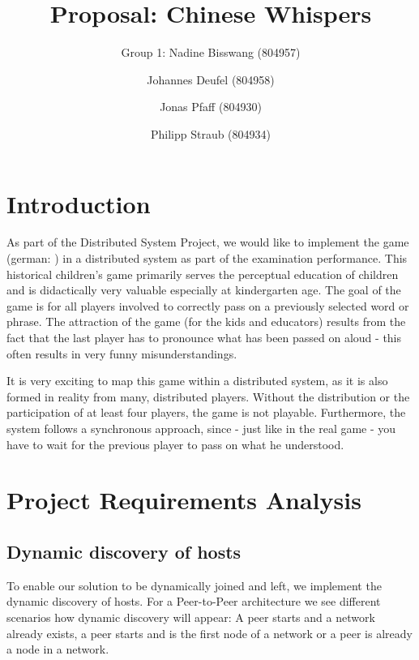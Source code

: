\documentclass[runningheads]{llncs}
\begin{document}
\title{Proposal: Chinese Whispers}

\author{Group 1: Nadine Bisswang (804957) \and Johannes Deufel (804958) \and Jonas Pfaff (804930) \and Philipp Straub (804934)}

\institute{}
%
\maketitle              %
\section{Introduction}
    As part of the Distributed System Project, we would like to implement the game  (german: ) in a distributed system as part of the examination performance. 
    This historical children's game primarily serves the perceptual education of children and is didactically very valuable especially at kindergarten age. The goal of the game is for all players involved to correctly pass on a previously selected word or phrase. The attraction of the game (for the kids and educators) results from the fact that the last player has to pronounce what has been passed on aloud - this often results in very funny misunderstandings. 
    
    
    It is very exciting to map this game within a distributed system, as it is also formed in reality from many, distributed players. Without the distribution or the participation of at least four players, the game is not playable. Furthermore, the system follows a synchronous approach, since - just like in the real game - you have to wait for the previous player to pass on what he understood.

\section{Project Requirements Analysis}
    \subsection{Dynamic discovery of hosts}
        To enable our solution to be dynamically joined and left, we implement the dynamic discovery of hosts. For a Peer-to-Peer architecture we see different scenarios how dynamic discovery will appear: A peer starts and a network already exists, a peer starts and is the first node of a network or a peer is already a node in a network.
        
\end{document}
